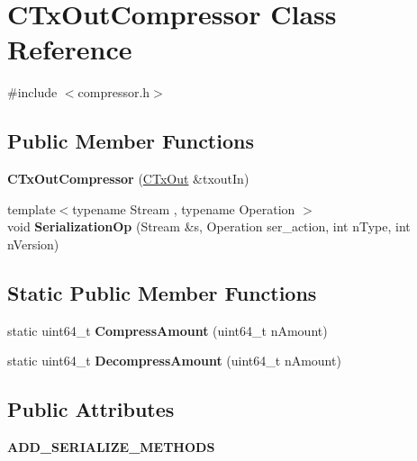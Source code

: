 \hypertarget{class_c_tx_out_compressor}{}\section{C\+Tx\+Out\+Compressor Class Reference}
\label{class_c_tx_out_compressor}


{\ttfamily \#include $<$compressor.\+h$>$}

\subsection*{Public Member Functions}
\begin{DoxyCompactItemize}
\item 
\mbox{\label{class_c_tx_out_compressor_a38ef1033989cd003de65598620d15cea}} 
{\bfseries C\+Tx\+Out\+Compressor} (\mbox{\hyperlink{class_c_tx_out}{C\+Tx\+Out}} \&txout\+In)
\item 
\mbox{\label{class_c_tx_out_compressor_aad933ec09f7d6a764bd49da399f9083b}} 
{\footnotesize template$<$typename Stream , typename Operation $>$ }\\void {\bfseries Serialization\+Op} (Stream \&s, Operation ser\+\_\+action, int n\+Type, int n\+Version)
\end{DoxyCompactItemize}
\subsection*{Static Public Member Functions}
\begin{DoxyCompactItemize}
\item 
\mbox{\label{class_c_tx_out_compressor_a4141cec8885a2da956abb79130c963a8}} 
static uint64\+\_\+t {\bfseries Compress\+Amount} (uint64\+\_\+t n\+Amount)
\item 
\mbox{\label{class_c_tx_out_compressor_a97751249d6a23b2a2b7bbc1165973371}} 
static uint64\+\_\+t {\bfseries Decompress\+Amount} (uint64\+\_\+t n\+Amount)
\end{DoxyCompactItemize}
\subsection*{Public Attributes}
\begin{DoxyCompactItemize}
\item 
\mbox{\label{class_c_tx_out_compressor_a520b323886560ededcfe303c4672481e}} 
{\bfseries A\+D\+D\+\_\+\+S\+E\+R\+I\+A\+L\+I\+Z\+E\+\_\+\+M\+E\+T\+H\+O\+DS}
\end{DoxyCompactItemize}



